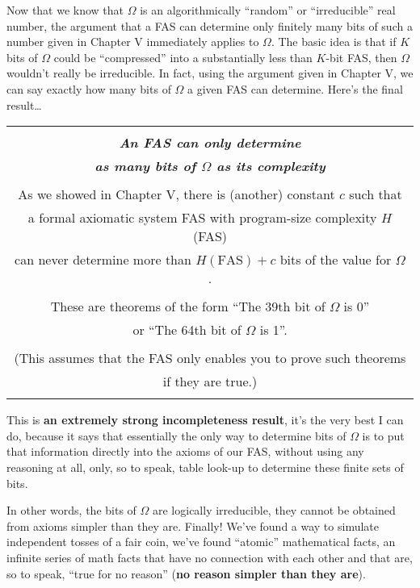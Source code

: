\documentclass[12pt]{book}
\begin{document}
Now that we know that $\Omega$ is an algorithmically ``random'' or ``irreducible'' real number,
the argument that a FAS can determine only finitely many bits of such a number given in
Chapter V immediately applies to $\Omega$.  
The basic idea is that if $K$ bits of $\Omega$ could be ``compressed'' into a substantially
less than $K$-bit FAS, then $\Omega$ wouldn't really be irreducible.
In fact, using the argument given in Chapter V,
we can say exactly how many bits of
$\Omega$ a given FAS can determine.
Here's the final result\ldots
 
\begin{center}
\begin{tabular}{|c|}
\hline
\\
\textbf{\large \emph{An FAS can only determine}}
\\
\textbf{\large \emph{as many bits of $\Omega$ as its complexity}}
\\ \\
As we showed in Chapter V, there is (another) constant $c$ such that
\\
a formal axiomatic system FAS with program-size complexity $H$(FAS)
\\
can never determine more than $H(\mbox{FAS}) + c$ bits of the value for $\Omega$.
\\ \\
These are theorems of the form ``The 39th bit of $\Omega$ is 0''
\\
or ``The 64th bit of $\Omega$ is 1''.  
\\ \\
(This assumes that the FAS only enables you to prove such theorems 
\\
if they are true.)
\\
\\
\hline
\end{tabular}
\end{center}
 
This is \textbf{an extremely strong incompleteness result}, it's the very best I can do,
because it says that essentially
the only way to determine bits of $\Omega$ is to put that information directly
into the axioms of our FAS, without using any reasoning at all, only, so to speak,
table look-up to determine these finite sets of bits.
 
In other words, the bits of $\Omega$ are logically irreducible, they cannot be obtained
from axioms simpler than they are.  Finally!  We've found a way to simulate independent
tosses of a fair coin, we've found ``atomic'' mathematical facts, 
an infinite series of math facts that have no connection with each other 
and that are, so to speak, ``true for no reason'' (\textbf{no reason simpler than they are}).
 
\end{document}
